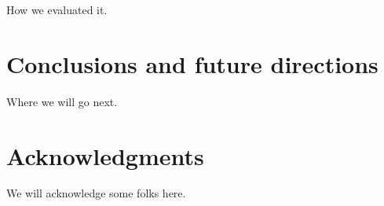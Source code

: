 \documentclass{acm_proc_article-sp}
\begin{document}
How we evaluated it.

\section{Conclusions and future directions}
\label{sec:conclusions}

Where we will go next.

\section{Acknowledgments}

We will acknowledge some folks here.


  

\end{document}
